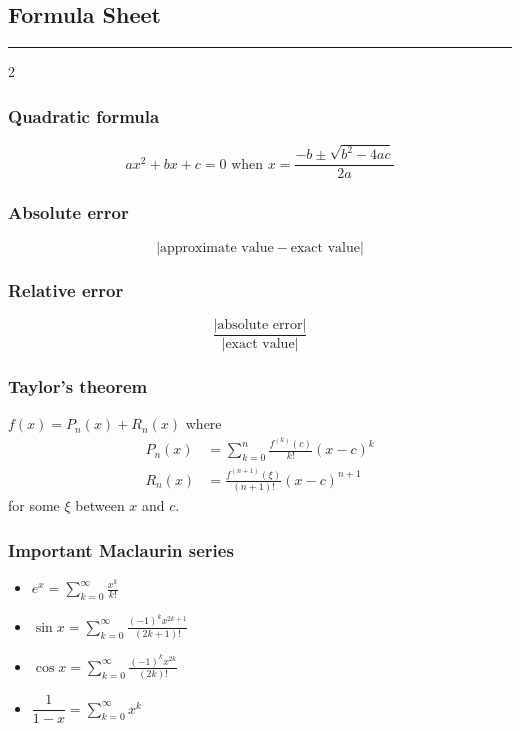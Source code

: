 \documentclass[10pt]{exam}
\newcommand{\ds}{\displaystyle}
\begin{document}
\pagestyle{empty}
\subsection*{Formula Sheet} 

\hrule 



\begin{multicols}{2}

\subsubsection*{Quadratic formula} 
$$\ds ax^2+bx+c = 0 \text{ when }  x = \frac{-b \pm \sqrt{b^2 - 4ac}}{2a}$$


\subsubsection*{Absolute error}
$$|\text{approximate value} - \text{exact value} |$$


\subsubsection*{Relative error}
$$\frac{|\text{absolute error}|}{|\text{exact value}|}$$


\subsubsection*{Taylor's theorem}
$f(x) = P_n(x) + R_n(x)$ where
\begin{align*}
P_n(x) &= \sum_{k = 0}^n \frac{f^{(k)}(c)}{k!} (x - c)^k  \\ 
R_n(x) &= \frac{f^{(n+1)}(\xi)}{(n+1)!} (x-c)^{n+1}
\end{align*}
for some $\xi$ between $x$ and $c$.







\subsubsection*{Important Maclaurin series}
\begin{itemize}
\item $e^x = \ds \sum_{k=0}^{\infty} \frac{x^k}{k!}$
\item $\sin x = \ds \sum_{k=0}^\infty \frac{(-1)^k x^{2k+1}}{(2k+1)!}$
\item $\cos x = \ds \sum_{k=0}^\infty \frac{(-1)^k x^{2k}}{(2k)!}$
\item $\dfrac{1}{1-x} = \ds \sum_{k=0}^\infty x^k$
\end{itemize}


\end{multicols}
\end{document}
